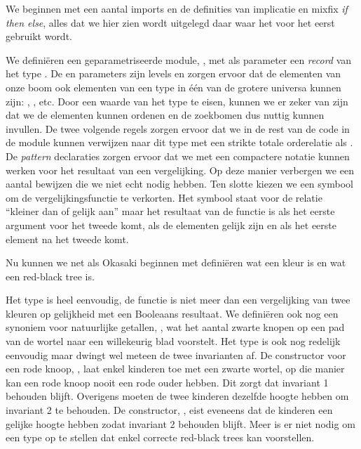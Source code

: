 
We beginnen met een aantal imports en de definities van implicatie en mixfix
\emph{if then else}, alles dat we hier zien wordt uitgelegd daar waar het voor
het eerst gebruikt wordt.


We definiëren een geparametriseerde module, , met als parameter
een \emph{record} van het type . De  en
 parameters zijn levels en zorgen ervoor dat de elementen van onze
boom ook elementen van een type in één van de grotere universa kunnen zijn:
, , etc.
Door een waarde van het type  te eisen, kunnen we er
zeker van zijn dat we de elementen kunnen ordenen en de zoekbomen dus nuttig
kunnen invullen. De twee volgende regels zorgen ervoor dat we in de rest van de
code in de module kunnen verwijzen naar dit type met een strikte totale
orderelatie als . De \emph{pattern} declaraties zorgen ervoor dat we
met een compactere notatie kunnen werken voor het resultaat van een
vergelijking. Op deze manier verbergen we een aantal bewijzen die we niet echt
nodig hebben. Ten slotte kiezen we een symbool om de vergelijkingsfunctie te
verkorten. Het symbool staat voor de relatie ``kleiner dan of gelijk aan'' maar
het resultaat van de functie is  als het eerste argument voor het
tweede komt,  als de elementen gelijk zijn en  als het
eerste element na het tweede komt.

Nu kunnen we net als Okasaki beginnen met definiëren wat een kleur is en wat een
red-black tree is.


Het type  is heel eenvoudig, de functie  is niet meer
dan een vergelijking van twee kleuren op gelijkheid met een Booleaans
resultaat. We definiëren ook nog een synoniem voor natuurlijke getallen,
, wat het aantal zwarte knopen op een pad van de wortel naar een
willekeurig blad voorstelt. Het type  is ook nog redelijk eenvoudig
maar dwingt wel meteen de twee invarianten af. De constructor voor een rode
knoop, , laat enkel kinderen toe met een zwarte wortel, op die manier
kan een rode knoop nooit een rode ouder hebben. Dit zorgt dat invariant 1
behouden blijft. Overigens moeten de twee kinderen dezelfde hoogte hebben om
invariant 2 te behouden. De constructor, , eist eveneens dat de
kinderen een gelijke hoogte hebben zodat invariant 2 behouden blijft. Meer is
er niet nodig om een type op te stellen dat enkel correcte red-black trees kan
voorstellen.

